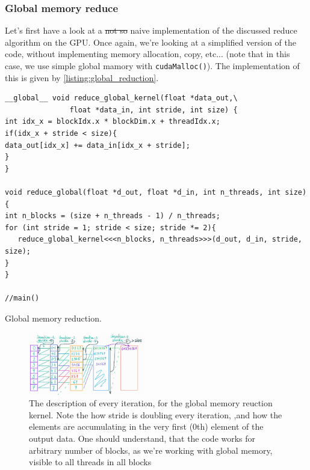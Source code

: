 \subsubsection*{Global memory reduce}
Let's first have a look at a \sout{not so} naive implementation of the discussed reduce algorithm on the GPU.
Once again, we're looking at a simplified version of the code, without implementing memory allocation, copy, etc... 
(note that in this case, we use simple global mamory with \verb|cudaMalloc()|). The implementation of this is given by \autoref{listing:global_reduction}.


\begin{listing}
\begin{verbatim}
__global__ void reduce_global_kernel(float *data_out,\
               float *data_in, int stride, int size) {
int idx_x = blockIdx.x * blockDim.x + threadIdx.x;
if(idx_x + stride < size){
data_out[idx_x] += data_in[idx_x + stride];
}
}

void reduce_global(float *d_out, float *d_in, int n_threads, int size) {
int n_blocks = (size + n_threads - 1) / n_threads;
for (int stride = 1; stride < size; stride *= 2){
   reduce_global_kernel<<<n_blocks, n_threads>>>(d_out, d_in, stride, size);
}
}

//main()
\end{verbatim}
    \caption{Global memory reduction. \cite{tuomanen2018hands}}
    \label{listing:global_reduction}
\end{listing}

\begin{figure}
   \vspace{-0.9cm}
   \begin{center}
   \includegraphics[width=0.45\textwidth]{pngs/reduce_only_global.jpg}
   \end{center}
   \vspace{-0.5cm}
   \captionsetup{justification=raggedleft}
   \caption{The description of every iteration, for the global memory 
   reuction kernel. Note the how stride is doubling every iteration, 
   ,and how the elements are accumulating in the very first (0th) element of the output data. 
   One should understand, that the code works for arbitrary number of blocks, as we're working with global 
   memory, visible to all threads in all blocks}
   \label{fig:reduced_global_only}
\end{figure}

